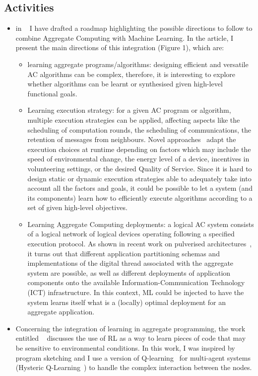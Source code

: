 \documentclass[11pt]{article}
\begin{document}
\subsection{Activities}
\begin{itemize}
	\item in \textit{}~\cite{roadmap} I have drafted 
 a roadmap highlighting the possible directions to follow to combine Aggregate Computing with Machine Learning.
%
In the article, I present the main directions of this integration (Figure 1), which are:
\begin{itemize}
	\item learning aggregate programs/algorithms: designing efficient and versatile AC algorithms can be complex, 
	therefore, it is interesting to explore whether algorithms can be learnt or synthesised given high-level functional goals.
	
	\item Learning execution strategy: for a given AC program or algorithm, 
	 multiple execution strategies can be applied, 
	 affecting aspects like the scheduling
	 of computation rounds, 
	 the scheduling of communications, 
	 the retention of messages from neighbours. 
	Novel approaches~\cite{zambonelli2021time} 
	 adapt the execution choices at runtime 
	 depending on factors which may include the speed of environmental change, 
	 the energy level of a device, incentives in volunteering settings, 
	 or the desired Quality of Service.
	Since it is hard to design static
	 or dynamic execution strategies able 
	 to adequately take into account all the factors and goals, 
	 it could be possible to let a system (and its components) 
	 learn how to efficiently execute algorithms according 
	 to a set of given high-level objectives.
	
	\item Learning Aggregate Computing deployments: a logical AC system consists of a logical network of
	 logical devices operating following a specified execution protocol. 
	As shown in recent work on pulverised architectures~\cite{Casadei2020}, 
	 it turns out that different application partitioning schemas and implementations of the digital thread associated 
	 with the aggregate system are possible, 
	 as well as different deployments of application components onto the available Information-Communication Technology (ICT) infrastructure. 
	In this context, ML could be injected to have 
	 the system learns itself what is a (locally) optimal deployment 
	 for an aggregate application.
\end{itemize}
\item Concerning the integration of learning in aggregate programming, the work 
 entitled \textit{}~\cite{aguzzi2022towards} 
 discusses the use of RL as a way to learn pieces of code 
 that may be sensitive to environmental conditions. 
In this work, I was inspired by program sketching 
 and I use a version of Q-learning~\cite{watkins1992q} for multi-agent systems (Hysteric Q-Learning~\cite{matignon2007hysteretic})
 to handle the complex interaction between the nodes. 
 

\end{itemize}
\end{document}

